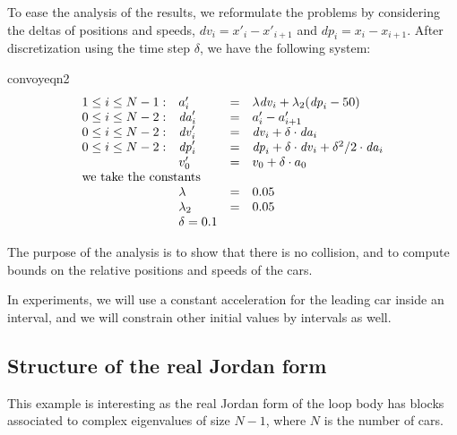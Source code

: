 \documentclass[a4paper,11pt]{article}
\begin{document}
To ease the analysis of the results, we reformulate the
problems by considering the deltas of positions and speeds,
$\mathit{dv}_i=x'_i-x'_{i+1}$ and $\mathit{dp}_i = x_i-x_{i+1}$.
After discretization using the time step $\delta$,
we have the following system:
\begin{center}
\begin{gif}[][130][130]{convoyeqn2}\boldmath
$$
\begin{array}{rlll}
  1\leq i\leq N-1 : & a_i' &=& \lambda \mathit{dv}_i +
  \lambda_2(\mathit{dp}_i - 50) \\
  0\leq i\leq N-2 :& \mathit{da}_i' &=& a_i'-a_{i+1}' \\
  0\leq i\leq N-2 :& \mathit{dv}_i' &=& \mathit{dv}_i +
  \delta\cdot\mathit{da}_i \\
  0\leq i\leq N-2 :& \mathit{dp}_i' &=& \mathit{dp}_i +
  \delta\cdot\mathit{dv}_i +
  \delta^2/2\cdot\mathit{da}_i \\
  & v_{0}' &=& v_{0} + \delta\cdot a_{0} \\
  \multicolumn{4}{l}{\textrm{we take the constants}} \\
  & \lambda &=& 0.05 \\
  & \lambda_2 &=& 0.05 \\
  & \delta = 0.1
\end{array}
$$
\end{gif}
\end{center}
The purpose of the analysis is to show that there is no collision,
and to compute bounds on the relative positions and speeds of the
cars.

In experiments, we will use a constant acceleration for the
leading car inside an interval, and we will constrain other
initial values by intervals as well.

\subsection{Structure of the real Jordan form}
This example is interesting as the real Jordan form of the loop
body has blocks associated to complex eigenvalues of size $N-1$,
where $N$ is the number of cars.
\end{document}
